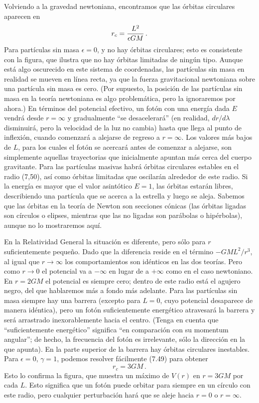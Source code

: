 \documentclass[11pt,b5paper,openany,twoside]{book}
\begin{document}
Volviendo a la gravedad newtoniana, encontramos que las órbitas circulares aparecen en
\begin{equation}
r_c = {{L^2}\over{\epsilon GM}}\,.\label{7.50}
\end{equation}
Para partículas sin masa $\epsilon=0$, y no hay órbitas circulares; esto es consistente con la figura, que ilustra que no hay órbitas limitadas de ningún tipo.
Aunque está algo oscurecido en este sistema de coordenadas, las partículas sin masa en realidad se mueven en línea recta, ya que la fuerza gravitacional newtoniana sobre una partícula sin masa es cero.
(Por supuesto, la posición de las partículas sin masa en la teoría newtoniana es algo problemática, pero la ignoraremos por ahora.)
En términos del potencial efectivo, un fotón con una energía dada $E$ vendrá desde $r=\infty$ y gradualmente ``se desacelerará'' (en realidad, $dr/d\lambda$ disminuirá, pero la velocidad de la luz no cambia) hasta que llega al punto de inflexión, cuando comenzará a alejarse de regreso a $r=\infty$.
Los valores más bajos de $L$, para los cuales el fotón se acercará antes de comenzar a alejarse, son simplemente aquellas trayectorias que inicialmente apuntan más cerca del cuerpo gravitante.
Para las partículas masivas habrá órbitas circulares estables en el radio (7,50), así como órbitas limitadas que oscilarán alrededor de este radio.
Si la energía es mayor que el valor asintótico $E=1$, las órbitas estarán libres, describiendo una partícula que se acerca a la estrella y luego se aleja.
Sabemos que las órbitas en la teoría de Newton son secciones cónicas (las órbitas ligadas son círculos o elipses, mientras que las no ligadas son parábolas o hipérbolas), aunque no lo mostraremos aquí.

En la Relatividad General la situación es diferente, pero sólo para $r$ suficientemente pequeño.
Dado que la diferencia reside en el término $-GML^2/r^3$, al igual que $r\rightarrow\infty$ los comportamientos son idénticos en las dos teorías.
Pero como $r\rightarrow 0$ el potencial va a $-\infty$ en lugar de a $+\infty$ como en el caso newtoniano.
En $r=2GM$ el potencial es siempre cero; dentro de este radio está el agujero negro, del que hablaremos más a fondo más adelante.
Para las partículas sin masa siempre hay una barrera (excepto para $L=0$, cuyo potencial desaparece de manera idéntica), pero un fotón suficientemente energético atravesará la barrera y será arrastrado inexorablemente hacia el centro.
(Tenga en cuenta que ``suficientemente energético'' significa ``en comparación con su momentum angular''; de hecho, la frecuencia del fotón es irrelevante, sólo la dirección en la que apunta).
En la parte superior de la barrera hay órbitas circulares inestables.
Para $\epsilon=0$, $\gamma=1$, podemos resolver fácilmente (7.49) para obtener
\begin{equation}
r_c = 3GM\,.\label{7.51}
\end{equation}
Esto lo confirma la figura, que muestra un máximo de $V(r)$ en $r=3GM$ por cada $L$.
Esto significa que un fotón puede orbitar para siempre en un círculo con este radio, pero cualquier perturbación hará que se aleje hacia $r=0$ o $r=\infty$.
\end{document}
